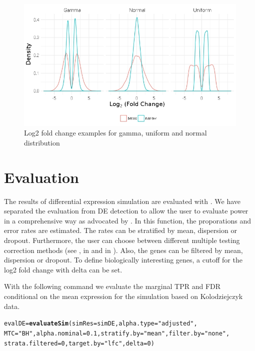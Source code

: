 \documentclass{article}\usepackage[]{graphicx}\usepackage[usenames,dvipsnames]{color}
\makeatletter
\newcommand{\hlnum}[1]{\textcolor[rgb]{0.686,0.059,0.569}{#1}}%
\newcommand{\hlstr}[1]{\textcolor[rgb]{0.192,0.494,0.8}{#1}}%
\newcommand{\hlstd}[1]{\textcolor[rgb]{0.345,0.345,0.345}{#1}}%
\newcommand{\hlkwb}[1]{\textcolor[rgb]{0.69,0.353,0.396}{#1}}%
\newcommand{\hlkwc}[1]{\textcolor[rgb]{0.333,0.667,0.333}{#1}}%
\newcommand{\hlkwd}[1]{\textcolor[rgb]{0.737,0.353,0.396}{\textbf{#1}}}%
\newenvironment{kframe}{%
 \def\at@end@of@kframe{}%
 \ifinner\ifhmode%
  \def\at@end@of@kframe{\end{minipage}}%
  \begin{minipage}{\columnwidth}%
 \fi\fi%
 \def\FrameCommand##1{\hskip\@totalleftmargin \hskip-\fboxsep
 \colorbox{shadecolor}{##1}\hskip-\fboxsep
     \hskip-\linewidth \hskip-\@totalleftmargin \hskip\columnwidth}%
 \MakeFramed {\advance\hsize-\width
   \@totalleftmargin\z@ \linewidth\hsize
   \@setminipage}}%
 {\par\unskip\endMakeFramed%
 \at@end@of@kframe}
\newenvironment{knitrout}{}{} %
\makeatother
\begin{document}
\begin{figure}[h]
\centering
\includegraphics[width=0.6\linewidth]{lfcdist.jpeg}
\caption{Log2 fold change examples for gamma, uniform and normal distribution}
\label{fig:lfcs}
\end{figure}

\section{Evaluation}

The results of differential expression simulation are evaluated with . We have separated the evaluation from DE detection to allow the user to evaluate power in a comprehensive way as advocated by \cite{Wu2015-uj}.
In this function, the proporations and error rates are estimated. The rates can be stratified by mean, dispersion or dropout. Furthermore, the user can choose between different multiple testing correction methods (see ,  in  and  in ). Also, the genes can be filtered by mean, dispersion or dropout. To define biologically interesting genes, a cutoff for the log2 fold change with delta can be set.

With the following command we evaluate the marginal TPR and FDR conditional on the mean expression for the simulation based on Kolodziejczyk data.

\begin{knitrout}
\color{fgcolor}\begin{kframe}
\begin{alltt}
\hlstd{evalDE} \hlkwb{=} \hlkwd{evaluateSim}\hlstd{(}\hlkwc{simRes} \hlstd{= simDE,} \hlkwc{alpha.type} \hlstd{=} \hlstr{"adjusted"}\hlstd{,}
    \hlkwc{MTC} \hlstd{=} \hlstr{"BH"}\hlstd{,} \hlkwc{alpha.nominal} \hlstd{=} \hlnum{0.1}\hlstd{,} \hlkwc{stratify.by} \hlstd{=} \hlstr{"mean"}\hlstd{,} \hlkwc{filter.by} \hlstd{=} \hlstr{"none"}\hlstd{,}
    \hlkwc{strata.filtered} \hlstd{=} \hlnum{0}\hlstd{,} \hlkwc{target.by} \hlstd{=} \hlstr{"lfc"}\hlstd{,} \hlkwc{delta} \hlstd{=} \hlnum{0}\hlstd{)}
\end{alltt}
\end{kframe}
\end{knitrout}
\end{document}
